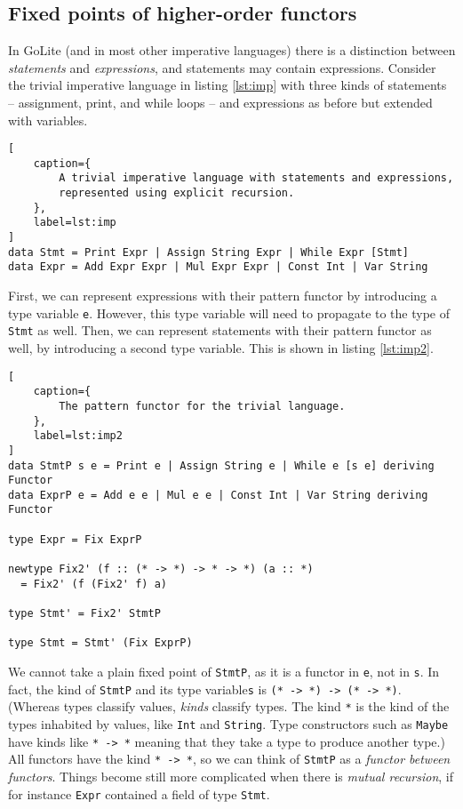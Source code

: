 \documentclass[letterpaper,11pt]{article}
\newcommand{\code}{\texttt}
\begin{document}
\subsection{Fixed points of higher-order functors} \label{sec:hfix}

In GoLite (and in most other imperative languages) there is a distinction
between \emph{statements} and \emph{expressions}, and statements may contain
expressions. Consider the trivial imperative language in listing \ref{lst:imp}
with three kinds of statements -- assignment, print, and while loops -- and
expressions as before but extended with variables.

\begin{lstlisting}[
    caption={
        A trivial imperative language with statements and expressions,
        represented using explicit recursion.
    },
    label=lst:imp
]
data Stmt = Print Expr | Assign String Expr | While Expr [Stmt]
data Expr = Add Expr Expr | Mul Expr Expr | Const Int | Var String
\end{lstlisting}

First, we can represent expressions with their pattern functor by introducing a
type variable \code{e}. However, this type variable will need to propagate to
the type of \code{Stmt} as well. Then, we can represent statements with their
pattern functor as well, by introducing a second type variable. This is shown
in listing \ref{lst:imp2}.

\begin{lstlisting}[
    caption={
        The pattern functor for the trivial language.
    },
    label=lst:imp2
]
data StmtP s e = Print e | Assign String e | While e [s e] deriving Functor
data ExprP e = Add e e | Mul e e | Const Int | Var String deriving Functor

type Expr = Fix ExprP

newtype Fix2' (f :: (* -> *) -> * -> *) (a :: *)
  = Fix2' (f (Fix2' f) a)

type Stmt' = Fix2' StmtP

type Stmt = Stmt' (Fix ExprP)
\end{lstlisting}

We cannot take a plain fixed point of \code{StmtP}, as it is a functor in
\code{e}, not in \code{s}. In fact, the kind of \code{StmtP} and its type
variable\code{s} is \code{(* -> *) -> (* -> *)}. (Whereas types classify
values, \emph{kinds} classify types. The kind \code{*} is the kind of the types
inhabited by values, like \code{Int} and \code{String}. Type constructors such
as \code{Maybe} have kinds like \code{* -> *} meaning that they take a type to
produce another type.) All functors have the kind \code{* -> *}, so we can
think of \code{StmtP} as a \emph{functor between functors}. Things become still
more complicated when there is \emph{mutual recursion}, if for instance
\code{Expr} contained a field of type \code{Stmt}.
\end{document}
